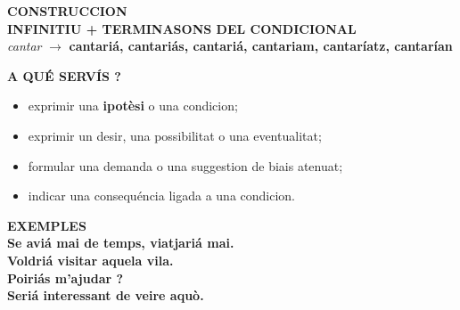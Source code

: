 \documentclass[a4paper,11pt]{article}
\begin{document}
\noindent\hspace*{6mm}\begin{minipage}{.91\textwidth}
\begin{violetbox}\textbf{\color{VioletDark}CONSTRUCCION}\\[1mm]\centering
{\Large\textbf{INFINITIU + TERMINASONS DEL CONDICIONAL}}\\[1mm]
\small \textit{cantar} $\rightarrow$ \textbf{cantariá, cantariás, cantariá, cantariam, cantaríatz, cantarían}
\end{violetbox}
\vspace{2.5mm}\begin{center}\end{center}
\vspace{1.5mm}\begin{violetbox}\textbf{\color{VioletDark}A QUÉ SERVÍS ?}\\[1mm]
\begin{itemize}\setlength{\itemsep}{.4mm}
\item exprimir una \textbf{ipotèsi} o una condicion;
\item exprimir un desir, una possibilitat o una eventualitat;
\item formular una demanda o una suggestion de biais atenuat;
\item indicar una consequéncia ligada a una condicion.
\end{itemize}\end{violetbox}
\vspace{2mm}\begin{violetbox}\textbf{\color{VioletDark}EXEMPLES}\\[1mm]
\textbf{Se aviá mai de temps, viatjariá mai.}\\
\textbf{Voldriá visitar aquela vila.}\\
\textbf{Poiriás m'ajudar ?}\\
\textbf{Seriá interessant de veire aquò.}
\end{violetbox}

\end{minipage}
\end{document}
